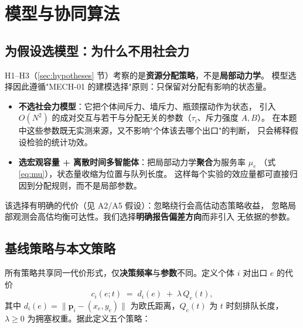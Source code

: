 \section{模型与协同算法}
\label{sec:model}

\subsection{为假设选模型：为什么不用社会力}
\label{sec:modelchoice}

H1--H3（\ref{sec:hypotheses} 节）考察的是\textbf{资源分配策略}，不是\textbf{局部动力学}。
模型选择因此遵循"MECH-01 的建模选择"原则：只保留对分配有影响的状态量。

\begin{itemize}
  \item \textbf{不选社会力模型}：它把个体间斥力、墙斥力、瓶颈摆动作为状态，
        引入 $O(N^2)$ 的成对交互与若干与分配无关的参数（$\tau_i$、斥力强度 $A,B$）。
        在本题中这些参数既无实测来源，又不影响"个体该去哪个出口"的判断，
        只会稀释假设检验的统计功效。
  \item \textbf{选宏观容量 + 离散时间多智能体}：把局部动力学\textbf{聚合}为服务率 $\mu_e$
        （式 \ref{eq:mu}），状态量收缩为位置与队列长度。
        这样每个实验的效应量都可直接归因到分配规则，而不是局部参数。
\end{itemize}

该选择有明确的代价（见 A2/A5 假设）：忽略绕行会高估动态策略收益，
忽略局部观测会高估均衡可达性。我们选择\textbf{明确报告偏差方向}而非引入
无依据的参数。

\subsection{基线策略与本文策略}
\label{sec:strategies}

所有策略共享同一代价形式，仅\textbf{决策频率}与\textbf{参数}不同。定义个体 $i$
对出口 $e$ 的代价
\begin{equation}
  c_i(e;t) \;=\; d_i(e) \;+\; \lambda\,Q_e(t),
  \label{eq:cost}
\end{equation}
其中 $d_i(e)=\|\mathbf p_i-(x_e,y_e)\|$ 为欧氏距离，$Q_e(t)$ 为 $t$ 时刻排队长度，
$\lambda\ge0$ 为拥塞权重。据此定义五个策略：

